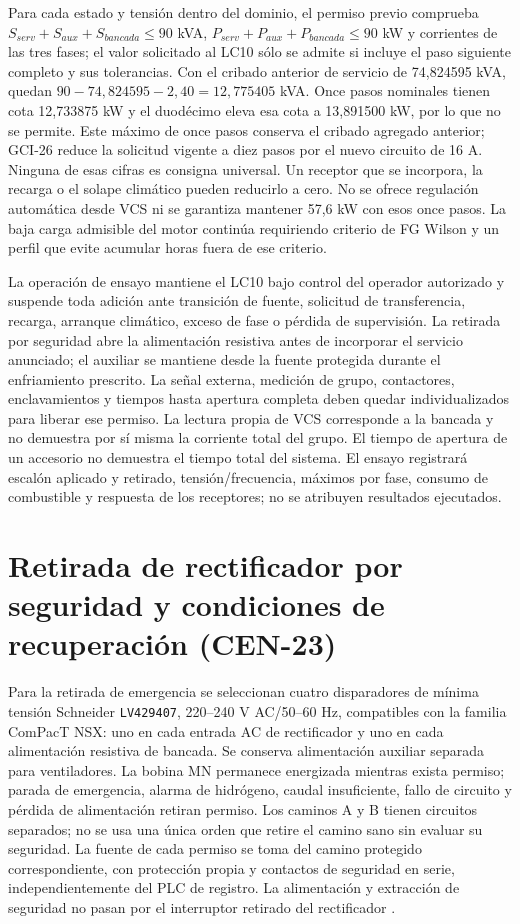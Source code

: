 Para cada estado y tensión dentro del dominio, el permiso previo comprueba $S_{serv}+S_{aux}+S_{bancada}\leq90$ kVA, $P_{serv}+P_{aux}+P_{bancada}\leq90$ kW y corrientes de las tres fases; el valor solicitado al LC10 sólo se admite si incluye el paso siguiente completo y sus tolerancias. Con el cribado anterior de servicio de 74,824595 kVA, quedan $90-74,824595-2,40=12,775405$ kVA. Once pasos nominales tienen cota 12,733875 kW y el duodécimo eleva esa cota a 13,891500 kW, por lo que no se permite. Este máximo de once pasos conserva el cribado agregado anterior; GCI-26 reduce la solicitud vigente a diez pasos por el nuevo circuito de 16 A. Ninguna de esas cifras es consigna universal. Un receptor que se incorpora, la recarga o el solape climático pueden reducirlo a cero. No se ofrece regulación automática desde VCS ni se garantiza mantener 57,6 kW con esos once pasos. La baja carga admisible del motor continúa requiriendo criterio de FG Wilson y un perfil que evite acumular horas fuera de ese criterio.

La operación de ensayo mantiene el LC10 bajo control del operador autorizado y suspende toda adición ante transición de fuente, solicitud de transferencia, recarga, arranque climático, exceso de fase o pérdida de supervisión. La retirada por seguridad abre la alimentación resistiva antes de incorporar el servicio anunciado; el auxiliar se mantiene desde la fuente protegida durante el enfriamiento prescrito. La señal externa, medición de grupo, contactores, enclavamientos y tiempos hasta apertura completa deben quedar individualizados para liberar ese permiso. La lectura propia de VCS corresponde a la bancada y no demuestra por sí misma la corriente total del grupo. El tiempo de apertura de un accesorio no demuestra el tiempo total del sistema. El ensayo registrará escalón aplicado y retirado, tensión/frecuencia, máximos por fase, consumo de combustible y respuesta de los receptores; no se atribuyen resultados ejecutados.

\section{Retirada de rectificador por seguridad y condiciones de recuperación (CEN-23)}
\label{sec:sd4-retirada-cen23}

Para la retirada de emergencia se seleccionan cuatro disparadores de mínima tensión Schneider \texttt{LV429407}, 220--240 V AC/50--60 Hz, compatibles con la familia ComPacT NSX: uno en cada entrada AC de rectificador y uno en cada alimentación resistiva de bancada. Se conserva alimentación auxiliar separada para ventiladores. La bobina MN permanece energizada mientras exista permiso; parada de emergencia, alarma de hidrógeno, caudal insuficiente, fallo de circuito y pérdida de alimentación retiran permiso. Los caminos A y B tienen circuitos separados; no se usa una única orden que retire el camino sano sin evaluar su seguridad. La fuente de cada permiso se toma del camino protegido correspondiente, con protección propia y contactos de seguridad en serie, independientemente del PLC de registro. La alimentación y extracción de seguridad no pasan por el interruptor retirado del rectificador \parencite[pp.~C-37 y F-38]{lote23-nsx2026}.

